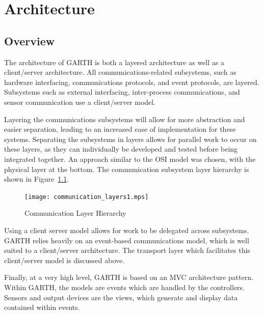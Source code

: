 \documentclass{report}
\begin{document}

\chapter{Architecture} %
\label{ch:architecture}

\section{Overview}
\label{sec:architecture_overview}

The architecture of GARTH is both a layered architecture as well as a
client/server architecture. All communications-related subsystems, such as
hardware interfacing, communications protocols, and event protocols, are
layered. Subsystems such as external interfacing, inter-process communications,
and sensor communication use a client/server model.

Layering the communications subsystems will allow for more abstraction and
easier separation, leading to an increased ease of implementation for these
systems. Separating the subsystems in layers allows for parallel work to occur
on these layers, as they can individually be developed and tested before being
integrated together. An approach similar to the OSI model was chosen, with the
physical layer at the bottom. The communication subsystem layer hierarchy is
shown in Figure~\ref{fig:communication_layers}.

\begin{figure}[hp]
    \centering
        \caption{Communication Layer Hierarchy}
        \scriptsize
        \setlength{\unitlength}{2.0em}
        \texttt{[image: communication\_layers1.mps]}
        \normalsize
    \label{fig:communication_layers}
\end{figure}

Using a client server model allows for work to be delegated across
subsystems. GARTH relies heavily on an event-based communications model, which
is well suited to a client/server architecture. The transport layer which
facilitates this client/server model is discussed above.

Finally, at a very high level, GARTH is based on an MVC architecture pattern.
Within GARTH, the models are events which are handled by the controllers. Sensors
and output devices are the views, which generate and display data contained within
events.
\end{document}
